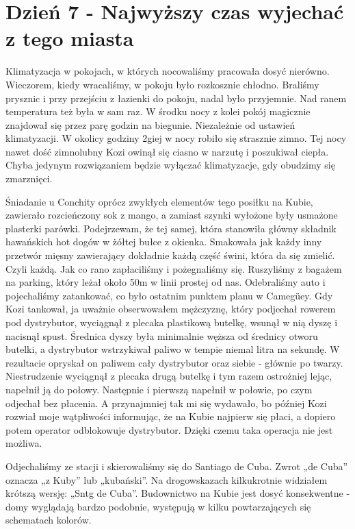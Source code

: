 
\chapter[Najwyższy czas wyjechać z tego miasta]{Dzień 7 - Najwyższy czas wyjechać z tego miasta}

Klimatyzacja w pokojach, w których nocowaliśmy pracowała dosyć nierówno.
Wieczorem, kiedy wracaliśmy, w pokoju było rozkosznie chłodno.
Braliśmy prysznic i przy przejściu z łazienki do pokoju, nadal było przyjemnie.
Nad ranem temperatura też była w sam raz.
W środku nocy z kolei pokój magicznie znajdował się przez parę godzin na biegunie.
Niezależnie od ustawień klimatyzacji.
W okolicy godziny 2giej w nocy robiło się strasznie zimno.
Tej nocy nawet dość zimnolubny Kozi owinął się ciasno w narzutę i poszukiwał ciepła.
Chyba jedynym rozwiązaniem będzie wyłączać klimatyzacje, gdy obudzimy się zmarznięci.
\par Śniadanie u Conchity oprócz zwykłych elementów tego posiłku na Kubie, zawierało rozcieńczony sok z mango, a zamiast szynki wyłożone były usmażone plasterki parówki.
Podejrzewam, że tej samej, która stanowiła główny składnik hawańskich hot dogów w żółtej bułce z okienka.
Smakowała jak każdy inny przetwór mięsny zawierający dokładnie każdą część świni, która da się zmielić.
Czyli każdą.
Jak co rano zapłaciliśmy i pożegnaliśmy się.
Ruszyliśmy z bagażem na parking, który leżał około 50m w linii prostej od nas.
Odebraliśmy auto i pojechaliśmy zatankować, co było ostatnim punktem planu w Camegüey.
Gdy Kozi tankował, ja uważnie obserwowałem mężczyznę, który podjechał rowerem pod dystrybutor, wyciągnął z plecaka plastikową butelkę, wsunął w nią dyszę i nacisnął spust.
Średnica dyszy była minimalnie węższa od średnicy otworu butelki, a dystrybutor wstrzykiwał paliwo w tempie niemal litra na sekundę.
W rezultacie opryskał on paliwem cały dystrybutor oraz siebie - głównie po twarzy.
Niestrudzenie wyciągnął z plecaka drugą butelkę i tym razem ostrożniej lejąc, napełnił ją do połowy.
Następnie i pierwszą napełnił w połowie, po czym odjechał bez płacenia.
A przynajmniej tak mi się wydawało, bo później Kozi rozwiał moje wątpliwości informując, że na Kubie najpierw się płaci, a dopiero potem operator odblokowuje dystrybutor.
Dzięki czemu taka operacja nie jest możliwa.
\par Odjechaliśmy ze stacji i skierowaliśmy się do Santiago de Cuba.
Zwrot „de Cuba” oznacza „z Kuby” lub „kubański”.
Na drogowskazach kilkukrotnie widziałem krótszą wersję: „Sntg de Cuba”.
Budownictwo na Kubie jest dosyć konsekwentne - domy wyglądają bardzo podobnie, występują w kilku powtarzających się schematach kolorów.
